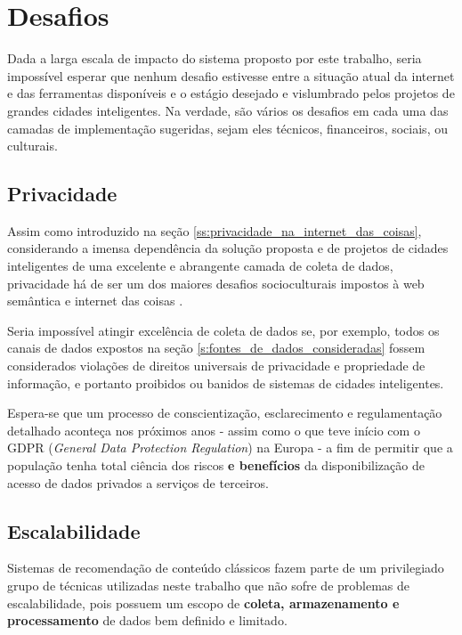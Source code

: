 \chapter{Desafios} \label{c:desafios}

Dada a larga escala de impacto do sistema proposto por este trabalho, seria impossível esperar que nenhum desafio estivesse entre a situação atual da internet e das ferramentas disponíveis e o estágio desejado e vislumbrado pelos projetos de grandes cidades inteligentes. Na verdade, são vários os desafios em cada uma das camadas de implementação sugeridas, sejam eles técnicos, financeiros, sociais, ou culturais.

\section{Privacidade}

Assim como introduzido na seção \ref{ss:privacidade_na_internet_das_coisas}, considerando a imensa dependência da solução proposta e de projetos de cidades inteligentes de uma excelente e abrangente camada de coleta de dados, privacidade há de ser um dos maiores desafios socioculturais impostos à web semântica e internet das coisas \cite{Kirrane2018PrivacySA}.

Seria impossível atingir excelência de coleta de dados se, por exemplo, todos os canais de dados expostos na seção \ref{s:fontes_de_dados_consideradas} fossem considerados violações de direitos universais de privacidade e propriedade de informação, e portanto proibidos ou banidos de sistemas de cidades inteligentes.

Espera-se que um processo de conscientização, esclarecimento e regulamentação detalhado aconteça nos próximos anos \cite{security:web3.0} - assim como o que teve início com o GDPR (\textit{General Data Protection Regulation}) na Europa - a fim de permitir que a população tenha total ciência dos riscos \textbf{e benefícios} da disponibilização de acesso de dados privados a serviços de terceiros.

\section{Escalabilidade}

Sistemas de recomendação de conteúdo clássicos fazem parte de um privilegiado grupo de técnicas utilizadas neste trabalho que não sofre de problemas de escalabilidade, pois possuem um escopo de \textbf{coleta, armazenamento e processamento} de dados bem definido e limitado.

